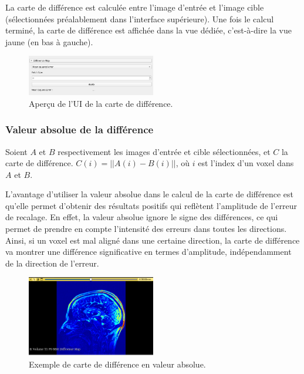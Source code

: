\documentclass{article}
\begin{document}
{{        La carte de différence est calculée entre l'image d'entrée et l'image cible (sélectionnées préalablement dans l'interface supérieure). Une fois le calcul terminé, la carte de différence est affichée dans la vue dédiée, c'est-à-dire la vue jaune (en bas à gauche).

        \begin{figure}[!ht]
            \centering
            \includegraphics[width=0.5\textwidth]{images/UI_difference_map.png}
            \caption{Aperçu de l'UI de la carte de différence.}
            \label{fig:UI_difference_map}
        \end{figure}

        \subsubsection{Valeur absolue de la différence}
        \label{subsubsec:absolute-difference-difference-map-computation-implementation}

        Soient $A$ et $B$ respectivement les images d'entrée et cible sélectionnées, et $C$ la carte de différence. $C(i) = ||A(i) - B(i)||$, où $i$ est l'index d'un voxel dans $A$ et $B$.

        \bigskip

        L'avantage d'utiliser la valeur absolue dans le calcul de la carte de différence est qu'elle permet d'obtenir des résultats positifs qui reflètent l'amplitude de l'erreur de recalage. En effet, la valeur absolue ignore le signe des différences, ce qui permet de prendre en compte l'intensité des erreurs dans toutes les directions. Ainsi, si un voxel est mal aligné dans une certaine direction, la carte de différence va montrer une différence significative en termes d'amplitude, indépendamment de la direction de l'erreur.

        \begin{figure}[!ht]
            \centering
            \includegraphics[width=0.5\textwidth]{images/absolute.png}
            \caption{Exemple de carte de différence en valeur absolue.}
            \label{fig:absolute}
        \end{figure}

}}
\end{document}

